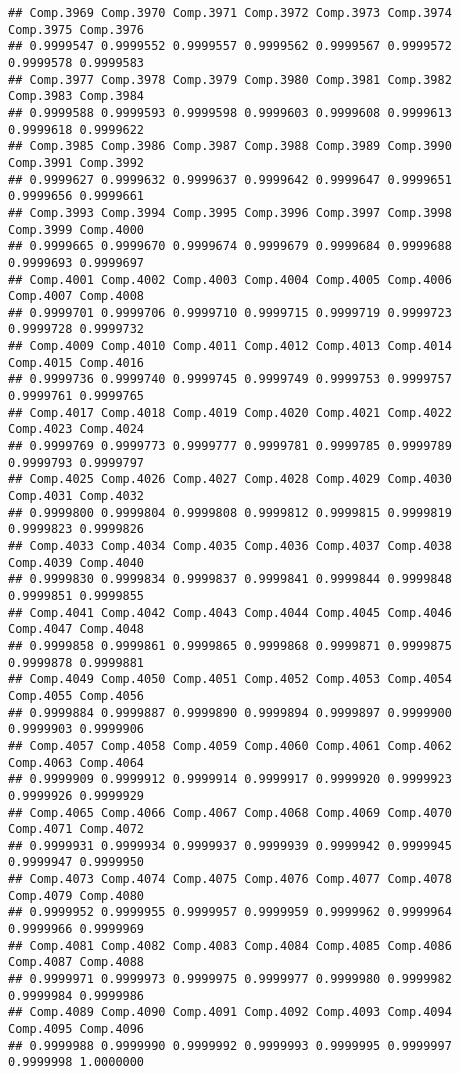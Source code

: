 \documentclass[
]{article}
\begin{document}
\begin{verbatim}
## Comp.3969 Comp.3970 Comp.3971 Comp.3972 Comp.3973 Comp.3974 Comp.3975 Comp.3976 
## 0.9999547 0.9999552 0.9999557 0.9999562 0.9999567 0.9999572 0.9999578 0.9999583 
## Comp.3977 Comp.3978 Comp.3979 Comp.3980 Comp.3981 Comp.3982 Comp.3983 Comp.3984 
## 0.9999588 0.9999593 0.9999598 0.9999603 0.9999608 0.9999613 0.9999618 0.9999622 
## Comp.3985 Comp.3986 Comp.3987 Comp.3988 Comp.3989 Comp.3990 Comp.3991 Comp.3992 
## 0.9999627 0.9999632 0.9999637 0.9999642 0.9999647 0.9999651 0.9999656 0.9999661 
## Comp.3993 Comp.3994 Comp.3995 Comp.3996 Comp.3997 Comp.3998 Comp.3999 Comp.4000 
## 0.9999665 0.9999670 0.9999674 0.9999679 0.9999684 0.9999688 0.9999693 0.9999697 
## Comp.4001 Comp.4002 Comp.4003 Comp.4004 Comp.4005 Comp.4006 Comp.4007 Comp.4008 
## 0.9999701 0.9999706 0.9999710 0.9999715 0.9999719 0.9999723 0.9999728 0.9999732 
## Comp.4009 Comp.4010 Comp.4011 Comp.4012 Comp.4013 Comp.4014 Comp.4015 Comp.4016 
## 0.9999736 0.9999740 0.9999745 0.9999749 0.9999753 0.9999757 0.9999761 0.9999765 
## Comp.4017 Comp.4018 Comp.4019 Comp.4020 Comp.4021 Comp.4022 Comp.4023 Comp.4024 
## 0.9999769 0.9999773 0.9999777 0.9999781 0.9999785 0.9999789 0.9999793 0.9999797 
## Comp.4025 Comp.4026 Comp.4027 Comp.4028 Comp.4029 Comp.4030 Comp.4031 Comp.4032 
## 0.9999800 0.9999804 0.9999808 0.9999812 0.9999815 0.9999819 0.9999823 0.9999826 
## Comp.4033 Comp.4034 Comp.4035 Comp.4036 Comp.4037 Comp.4038 Comp.4039 Comp.4040 
## 0.9999830 0.9999834 0.9999837 0.9999841 0.9999844 0.9999848 0.9999851 0.9999855 
## Comp.4041 Comp.4042 Comp.4043 Comp.4044 Comp.4045 Comp.4046 Comp.4047 Comp.4048 
## 0.9999858 0.9999861 0.9999865 0.9999868 0.9999871 0.9999875 0.9999878 0.9999881 
## Comp.4049 Comp.4050 Comp.4051 Comp.4052 Comp.4053 Comp.4054 Comp.4055 Comp.4056 
## 0.9999884 0.9999887 0.9999890 0.9999894 0.9999897 0.9999900 0.9999903 0.9999906 
## Comp.4057 Comp.4058 Comp.4059 Comp.4060 Comp.4061 Comp.4062 Comp.4063 Comp.4064 
## 0.9999909 0.9999912 0.9999914 0.9999917 0.9999920 0.9999923 0.9999926 0.9999929 
## Comp.4065 Comp.4066 Comp.4067 Comp.4068 Comp.4069 Comp.4070 Comp.4071 Comp.4072 
## 0.9999931 0.9999934 0.9999937 0.9999939 0.9999942 0.9999945 0.9999947 0.9999950 
## Comp.4073 Comp.4074 Comp.4075 Comp.4076 Comp.4077 Comp.4078 Comp.4079 Comp.4080 
## 0.9999952 0.9999955 0.9999957 0.9999959 0.9999962 0.9999964 0.9999966 0.9999969 
## Comp.4081 Comp.4082 Comp.4083 Comp.4084 Comp.4085 Comp.4086 Comp.4087 Comp.4088 
## 0.9999971 0.9999973 0.9999975 0.9999977 0.9999980 0.9999982 0.9999984 0.9999986 
## Comp.4089 Comp.4090 Comp.4091 Comp.4092 Comp.4093 Comp.4094 Comp.4095 Comp.4096 
## 0.9999988 0.9999990 0.9999992 0.9999993 0.9999995 0.9999997 0.9999998 1.0000000
\end{verbatim}
\end{document}
